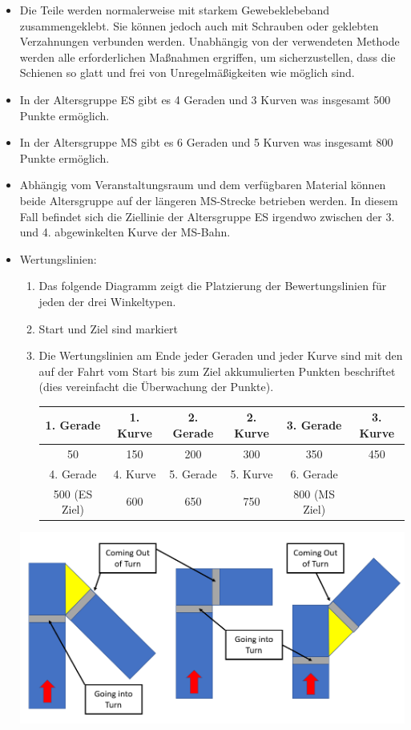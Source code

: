 \documentclass[a4paper,12pt]{article}
\begin{document}
\begin{itemize}
	\item Die Teile werden normalerweise mit starkem Gewebeklebeband zusammengeklebt. Sie können jedoch auch mit Schrauben oder geklebten Verzahnungen verbunden werden. Unabhängig von der verwendeten Methode werden alle erforderlichen Maßnahmen ergriffen, um sicherzustellen, dass die Schienen so glatt und frei von Unregelmäßigkeiten wie möglich sind.
	\item In der Altersgruppe ES gibt es 4 Geraden und 3 Kurven was insgesamt 500 Punkte ermöglich.
	\item In der Altersgruppe MS gibt es 6 Geraden und 5 Kurven was insgesamt 800 Punkte ermöglich.
	\item Abhängig vom Veranstaltungsraum und dem verfügbaren Material können beide Altersgruppe auf der längeren MS-Strecke betrieben werden. In diesem Fall befindet sich die Ziellinie der Altersgruppe ES irgendwo zwischen der 3. und 4. abgewinkelten Kurve der MS-Bahn.

	\item Wertungslinien:
		\begin{enumerate}
			\item Das folgende Diagramm zeigt die Platzierung der Bewertungslinien für jeden der drei Winkeltypen.
			\item Start und Ziel sind markiert
			\item Die Wertungslinien am Ende jeder Geraden und jeder Kurve sind mit den auf der Fahrt vom Start bis zum Ziel akkumulierten Punkten beschriftet (dies vereinfacht die Überwachung der Punkte).
				\begin{center}
					\begin{tabular}{|c|c|c|c|c|c|} \hline
						\rowcolor{Gray}
						1. Gerade & 1. Kurve & 2. Gerade & 2. Kurve & 3. Gerade & 3. Kurve  \\ \hline
						50 & 150 & 200 & 300 & 350 & 450  \\ \hline
						\rowcolor{Gray}
						4. Gerade & 4. Kurve & 5. Gerade & 5. Kurve & 6. Gerade & \\ \hline
						500 (ES Ziel) & 600 & 650 & 750 & 800 (MS Ziel) & \\ \hline
					\end{tabular}
				\end{center}
		\end{enumerate}
		\includegraphics[width=1.0\textwidth]{amazeing_angle.png}
\end{itemize}
\end{document}
